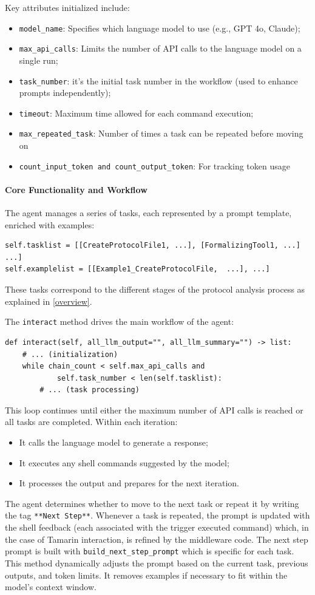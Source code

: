 Key attributes initialized include:
\begin{itemize}
\item \texttt{model\_name}: Specifies which language model to use (e.g., GPT 4o, Claude);
\item \texttt{max\_api\_calls}: Limits the number of API calls to the language model on a single run;
\item \texttt{task\_number}: it's the initial task number in the workflow (used to enhance prompts independently);
\item \texttt{timeout}: Maximum time allowed for each command execution;
\item \texttt{max\_repeated\_task}: Number of times a task can be repeated before moving on
\item \texttt{count\_input\_token and count\_output\_token}: For tracking token usage
\end{itemize}

\paragraph{Core Functionality and Workflow}
The agent manages a series of tasks, each represented by a prompt template, enriched with examples:
\begin{verbatim}
self.tasklist = [[CreateProtocolFile1, ...], [FormalizingTool1, ...] ...]
self.examplelist = [[Example1_CreateProtocolFile,  ...], ...]
\end{verbatim}
These tasks correspond to the different stages of the protocol analysis process as explained in \ref{overview}.

The \texttt{interact} method drives the main workflow of the agent:

\begin{verbatim}
def interact(self, all_llm_output="", all_llm_summary="") -> list:
    # ... (initialization)
    while chain_count < self.max_api_calls and 
            self.task_number < len(self.tasklist):
        # ... (task processing)
\end{verbatim}

This loop continues until either the maximum number of API calls is reached or all tasks are completed. Within each iteration:
\begin{itemize}
    \item It calls the language model to generate a response;
    \item It executes any shell commands suggested by the model;
    \item It processes the output and prepares for the next iteration.     
\end{itemize}
The agent determines whether to move to the next task or repeat it by writing the tag \texttt{**Next Step**}. Whenever a task is repeated, the prompt is updated with the shell feedback (each associated with the trigger executed command) which, in the case of Tamarin interaction, is refined by the middleware code.
The next step prompt is built with \texttt{build\_next\_step\_prompt} which is specific for each task. This method dynamically adjusts the prompt based on the current task, previous outputs, and token limits. It removes examples if necessary to fit within the model's context window.

